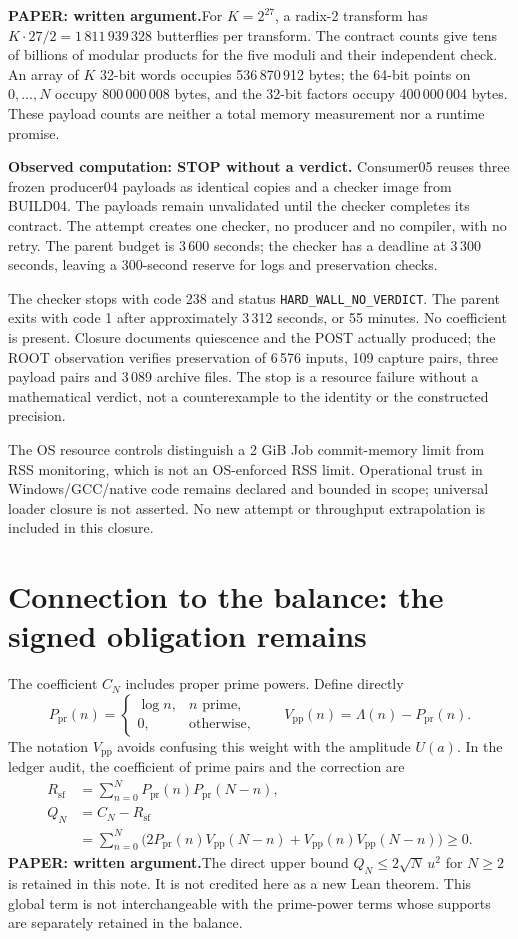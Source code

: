 \documentclass[11pt,a4paper]{article}
\theoremstyle{remark}
\newcommand{\Lam}{\Lambda}
\newcommand{\paper}{\textbf{PAPER: written argument.}\space}
\begin{document}
\paper For $K=2^{27}$, a radix-2 transform has
$K\cdot27/2=1\,811\,939\,328$ butterflies per transform. The contract counts
give tens of billions of modular products for the five moduli and their
independent check. An array of $K$ 32-bit words occupies 536\,870\,912 bytes;
the 64-bit points on $0,\ldots,N$ occupy 800\,000\,008 bytes, and the 32-bit
factors occupy 400\,000\,004 bytes. These payload counts are neither a total
memory measurement nor a runtime promise.

\textbf{Observed computation: STOP without a verdict.} Consumer05 reuses
three frozen producer04 payloads as identical copies and a checker image
from BUILD04. The payloads remain unvalidated until the checker completes
its contract. The attempt creates one checker, no producer and no compiler,
with no retry. The parent budget is 3\,600 seconds; the checker has a deadline
at 3\,300 seconds, leaving a 300-second reserve for logs and preservation checks.

The checker stops with code 238 and status \texttt{HARD\_WALL\_NO\_VERDICT}.
The parent exits with code 1 after approximately 3\,312 seconds, or 55 minutes.
No coefficient is present. Closure documents quiescence and the POST actually
produced; the ROOT observation verifies preservation of 6\,576 inputs,
109 capture pairs, three payload pairs and 3\,089 archive files.
The stop is a resource failure without a mathematical verdict, not a
counterexample to the identity or the constructed precision.

The OS resource controls distinguish a 2 GiB Job commit-memory limit from
RSS monitoring, which is not an OS-enforced RSS limit. Operational trust
in Windows/GCC/native code remains declared and bounded in scope; universal
loader closure is not asserted. No new attempt or throughput extrapolation
is included in this closure.

\clearpage
\section{Connection to the balance: the signed obligation remains}\label{sec:dn}
The coefficient $C_N$ includes proper prime powers.
Define directly
\[
P_{\mathrm{pr}}(n)=\begin{cases}\log n,&n\text{ prime},\\0,&\text{otherwise},\end{cases}
\qquad V_{\mathrm{pp}}(n)=\Lam(n)-P_{\mathrm{pr}}(n).
\]
The notation $V_{\mathrm{pp}}$ avoids confusing this weight with the amplitude
$U(a)$. In the ledger audit, the coefficient of prime pairs and the
correction are
\begin{align}
R_{\mathrm{sf}}&=\sum_{n=0}^N P_{\mathrm{pr}}(n)P_{\mathrm{pr}}(N-n),\\
Q_N&=C_N-R_{\mathrm{sf}}\nonumber\\
&=\sum_{n=0}^N\bigl(2P_{\mathrm{pr}}(n)V_{\mathrm{pp}}(N-n)
+V_{\mathrm{pp}}(n)V_{\mathrm{pp}}(N-n)\bigr)\ge0.
\label{eq:PP}
\end{align}
\paper The direct upper bound $Q_N\le2\sqrt N\,u^2$ for $N\ge2$
is retained in this note. It is not credited here as a new
Lean theorem. This global term is not interchangeable with the
prime-power terms whose supports are separately retained in the balance.
\end{document}
